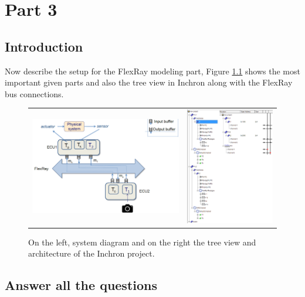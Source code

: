 \chapter{Part 3}

\section{Introduction}

Now describe the setup for the FlexRay modeling part, Figure \ref{fig:FRdia} shows the most important given parts and also the tree view in Inchron along with the FlexRay bus connections.

\begin{figure}[h!]
	\begin{center}
		
			\begin{tabular}{cc}
				\includegraphics[width=0.5\linewidth]{img/FR-diagram} & \includegraphics[width=0.35\linewidth]{img/FR-setup}	\\
			\end{tabular}
			\caption{On the left, system diagram and on the right the tree view and architecture of the Inchron project. }
		\caption{}
		\label{fig:FRdia}
	\end{center}
\end{figure}


\section{Answer all the questions}

